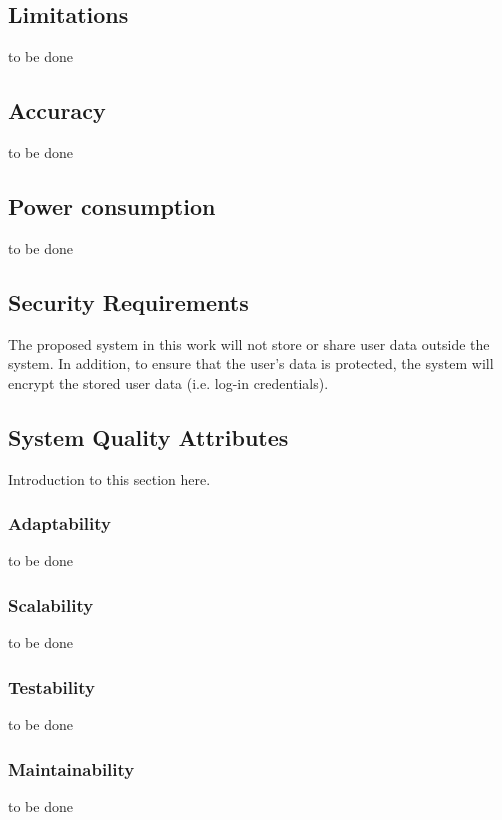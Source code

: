     \subsection{Limitations}
    to be done
    
    \subsection{Accuracy}
    to be done
    
    \subsection{Power consumption}
    to be done 
    
    \subsection{Security Requirements}
    The proposed system in this work will not store or share user data outside the system. In addition, to ensure that the user's data is protected, the system will encrypt the stored user data (i.e. log-in credentials). 
    
    \subsection{System Quality Attributes}
    Introduction to this section here.
        \subsubsection{Adaptability}
        to be done
        \subsubsection{Scalability}
        to be done
        \subsubsection{Testability}
        to be done
        \subsubsection{Maintainability}
        to be done
    
    
    